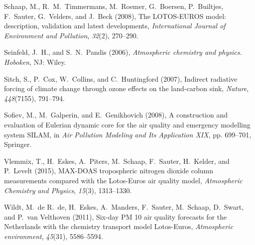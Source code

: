 \documentclass[9pt]{report}
\begin{document}
{\begin{thebibliography}{28}
\mdbibitemlabel{}Schaap, M., R.~M.~Timmermans, M.~Roemer, G.~Boersen, P.~Builtjes, F.~Sauter, G.~Velders, and J.~Beck (2008), The LOTOS-EUROS model: description, validation and latest developments, \emph{International Journal of Environment and Pollution}, \emph{32}(2), 270–290.\label{schaap2008lotos}%

\mdbibitemlabel{}Seinfeld, J.~H., and S.~N.~Pandis (2006), \emph{Atmospheric chemistry and physics. Hoboken}, NJ: Wiley.\label{seinfeld2006atmospheric}%

\mdbibitemlabel{}Sitch, S., P.~Cox, W.~Collins, and C.~Huntingford (2007), Indirect radiative forcing of climate change through ozone effects on the land-carbon sink, \emph{Nature}, \emph{448}(7155), 791–794.\label{sitch2007indirect}%

\mdbibitemlabel{}Sofiev, M., M.~Galperin, and E.~Genikhovich (2008), A construction and evaluation of Eulerian dynamic core for the air quality and emergency modelling system SILAM, in \emph{Air Pollution Modeling and Its Application XIX}, pp. 699–701, Springer.\label{sofiev2008construction}%

\mdbibitemlabel{}Vlemmix, T., H.~Eskes, A.~Piters, M.~Schaap, F.~Sauter, H.~Kelder, and P.~Levelt (2015), MAX-DOAS tropospheric nitrogen dioxide column measurements compared with the Lotos-Euros air quality model, \emph{Atmospheric Chemistry and Physics}, \emph{15}(3), 1313–1330.\label{vlemmix2015max}%

\mdbibitemlabel{}Wildt, M.~de R.~de, H.~Eskes, A.~Manders, F.~Sauter, M.~Schaap, D.~Swart, and P.~van Velthoven (2011), Six-day PM 10 air quality forecasts for the Netherlands with the chemistry transport model Lotos-Euros, \emph{Atmospheric environment}, \emph{45}(31), 5586–5594.\label{de2011six}%
\par%
\end{thebibliography}}%
\end{document}
